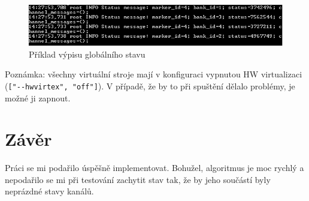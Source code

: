 \documentclass[11pt,a4paper]{scrartcl}
\begin{document}
	\begin{figure}[H]
		\centering
		\includegraphics[width=15cm]{img/global-state.png}
		\caption{Příklad výpisu globálního stavu}
		\label{fig:global-state}
	\end{figure}
	
	Poznámka: všechny virtuální stroje mají v konfiguraci vypnutou HW virtualizaci (\verb|["--hwvirtex", "off"]|). V případě, že by to při spuštění dělalo problémy, je možné ji zapnout.
	
	\section{Závěr}
	Práci se mi podařilo úspěšně implementovat. Bohužel, algoritmus je moc rychlý a nepodařilo se mi při testování zachytit stav tak, že by jeho součástí byly neprázdné stavy kanálů.
	
\end{document}
